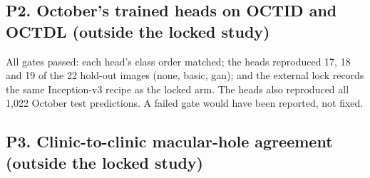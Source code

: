 \subsection*{P2. October's trained heads on OCTID and OCTDL (outside the locked study)}
\begin{table}[!htbp]
\caption{Post hoc, rule committed 16 Nov 2026; outside the locked study (rule 4): October's nine-way heads, trained with real rare images only (none), with basic augmentation (basic) or with CycleGAN images (gan), applied unchanged to the locked Inception-v3 features of OCTID and OCTDL. Counts of images.}
\label{tab:p2}
\centering\footnotesize

\end{table}
All gates passed: each head's class order matched; the heads reproduced 17, 18 and 19 of the 22 hold-out images (none, basic, gan); and the external lock records the same Inception-v3 recipe as the locked arm. The heads also reproduced all 1,022 October test predictions. A failed gate would have been reported, not fixed.

\subsection*{P3. Clinic-to-clinic macular-hole agreement (outside the locked study)}
\begin{table}[!htbp]
\caption{Post hoc, rule committed 16 Nov 2026; outside the locked study (rule 4): OCTDL macular holes used as examples although A1 makes them query-only. Agreement between two macular-hole labels, never transfer. Two-way (NORMAL against MH) macro recall, mean over $K=1$--8 and 100 draws, chance 0.50; OCTDL examples at most one image per patient per class; OCTDL queries scored per image and per patient. Per-$K$ rows and the number of draws in which every query went to one class are in \texttt{P3\_clinic\_to\_clinic\_mh.csv} (released).}
\label{tab:p3}
\centering\footnotesize

\end{table}

